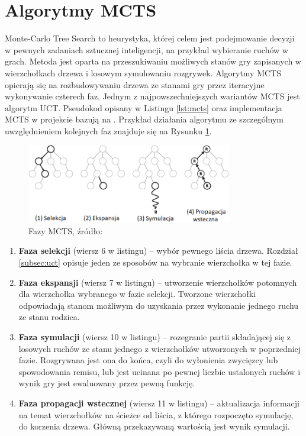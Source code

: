 \documentclass[a4paper,12pt]{article}
\let\oldsection\section
\renewcommand\section{\clearpage\oldsection}
\begin{document}
\section{Algorytmy MCTS}
Monte-Carlo Tree Search to heurystyka, której celem jest podejmowanie decyzji w pewnych zadaniach sztucznej inteligencji, na przykład wybieranie ruchów w grach. Metoda jest oparta na przeszukiwaniu możliwych stanów gry zapisanych w wierzchołkach drzewa i losowym symulowaniu rozgrywek. Algorytmy MCTS opierają się na rozbudowywaniu drzewa ze stanami gry przez iteracyjne wykonywanie czterech faz. Jednym z najpowszechniejszych wariantów MCTS jest algorytm UCT. Pseudokod opisany w Listingu \ref{lst:mcts} oraz implementacja MCTS w projekcie bazują na \cite{banditbased}. Przykład działania algorytmu ze szczególnym uwzględnieniem kolejnych faz znajduje się na Rysunku \ref{rys:mcts_phases}.

\begin{figure}[h]
	\centering
	\includegraphics[width=0.8\textwidth]{mcts_phases_pl.png}
	\caption{Fazy MCTS, źródło: \cite{mctsanalysis}}
	\label{rys:mcts_phases}
\end{figure}

\begin{enumerate}
	\item \textbf{Faza selekcji} (wiersz 6 w listingu) -- wybór pewnego liścia drzewa. Rozdział \ref{subsec:uct} opisuje jeden ze sposobów na wybranie wierzchołka w tej fazie.
	\item \textbf{Faza ekspansji} (wiersz 7 w listingu) -- utworzenie wierzchołków potomnych dla wierzchołka wybranego w fazie selekcji. Tworzone wierzchołki odpowiadają stanom możliwym do uzyskania przez wykonanie jednego ruchu ze stanu rodzica.
	\item \textbf{Faza symulacji} (wiersz 10 w listingu) -- rozegranie partii składającej się z losowych ruchów ze stanu jednego z wierzchołków utworzonych w poprzedniej fazie. Rozgrywana jest ona do końca, czyli do wyłonienia zwycięzcy lub spowodowania remisu, lub jest ucinana po pewnej liczbie ustalonych ruchów i wynik gry jest ewaluowany przez pewną funkcję.
	\item \textbf{Faza propagacji wstecznej} (wiersz 11 w listingu) -- aktualizacja informacji na temat wierzchołków na ścieżce od liścia, z którego rozpoczęto symulację, do korzenia drzewa. Główną przekazywaną wartością jest wynik symulacji.
\end{enumerate}
\end{document}
